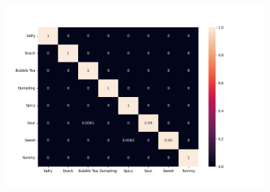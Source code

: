 \documentclass[12pt,a4paper]{report}
\begin{document}
\begin{CJK*}{UTF8}{bkai}
\begin{enumerate}
\begin{enumerate}
                        \includegraphics[width=100mm]{Lstm_confusion_matrix.png}


              \end{enumerate}
              \newpage


\end{enumerate}
\end{CJK*}
\end{document}
